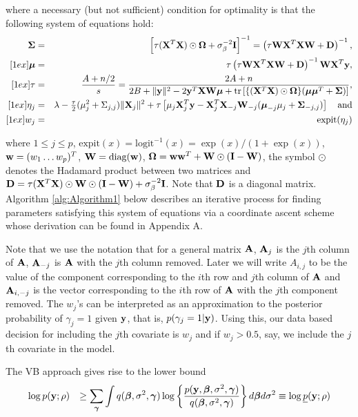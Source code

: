 \documentclass[11pt]{article}
\newtheorem{Main Result}{Main Result}
\def\vectorfontone{\bf}
\def\vectorfonttwo{\boldsymbol}
\def\vu{{\vectorfontone u}}                      %
\def\vw{{\vectorfontone w}}                      %
\def\vy{{\vectorfontone y}}                      %
\def\vbeta{{\vectorfonttwo \beta}}               %
\def\vgamma{{\vectorfonttwo \gamma}}             %
\def\vmu{{\vectorfonttwo \mu}}                   %
\def\matrixfontone{\bf}
\def\matrixfonttwo{\boldsymbol}
\def\mA{{\matrixfontone A}}                      %
\def\mD{{\matrixfontone D}}                      %
\def\mI{{\matrixfontone I}}                      %
\def\mW{{\matrixfontone W}}                      %
\def\mX{{\matrixfontone X}}                      %
\def\mSigma{{\matrixfonttwo \Sigma}}             %
\def\mOmega{{\matrixfonttwo \Omega}}             %
\def\ds{\displaystyle}
\def\tr{\text{tr}}
\DeclareMathOperator{\expit}{expit}
\newcommand{\joc}[1]{{\color{black}#1}}
\begin{document}
\noindent where a necessary (but  not sufficient) condition
for optimality is that the following system of equations hold:
\begin{eqnarray}
\mSigma &=&
\left[\tau (\mX^{T}\mX)\odot\mOmega + \sigma_\beta^{-2}\mI \right]^{-1}= \left( \tau\mW\mX^T\mX\mW + \mD \right)^{-1},\label{eq:mSigma}\\ [1ex]
\vmu
&=& \tau\left( \tau\mW\mX^T\mX\mW + \mD \right)^{-1}\mW\mX^{T}\vy,\label{eq:vmu}\\ [1ex]
\tau
&=& \frac{A+n/2}{s}= \frac{2A+n}{2B +
	\|\vy\|^2 - 2\vy^{T}\mX\mW\vmu
	+\tr\left[ \{(\mX^{T}\mX)\odot\mOmega\}(\vmu\vmu^{T} + \mSigma) \right]},\label{eq:tau}\\ [1ex]
\eta_j
&=&  \lambda
- \tfrac{\tau}{2} (\mu_j^2 + \Sigma_{j,j})\| \mX_j \|^2 + \tau\left[
\mu_j\mX_j^{T}\vy - \mX_j^{T}\mX_{-j}\mW_{-j}(\vmu_{-j}\mu_j + \mSigma_{-j,j})\right] \quad \mbox{and} \label{eq:etaj}\\ [1ex]
w_j
&=& \expit(\eta_j) \label{eq:wj}
\end{eqnarray}

\noindent where $1\le j\le p$, \joc{$\mbox{expit}(x) = \mbox{logit}^{-1}(x) = \exp(x)/(1+\exp(x))$,} 
$\vw=(w_1 \ldots w_p)^{T}$, $\mW=\mbox{diag}(\vw)$,
$\mOmega = \vw\vw^{T} + \mW\odot(\mI - \mW)$,
the symbol $\odot$ denotes the Hadamard product between two matrices
and
$\mD=\tau(\mX^T\mX)\odot\mW\odot(\mI-\mW)+\sigma_\beta^{-2}\mI$. Note that $\mD$ is
a diagonal matrix. Algorithm \ref{alg:Algorithm1} below describes an iterative process for finding
parameters satisfying this system of equations via a coordinate ascent scheme
\joc{whose derivation can be found in Appendix A.}




Note that we use the
notation that for a general matrix $\mA$, $\mA_j$ is the $j$th column of
$\mA$, $\mA_{-j}$ is $\mA$ with the $j$th column removed. Later we will
write $A_{i,j}$ to be the value \joc{of} the component corresponding to the $i$th row and
$j$th column of $\mA$ and $\mA_{i,-j}$ is the vector corresponding to the $i$th row of
$\mA$ with the $j$th component removed. The $w_j$'s can be interpreted as an
approximation to the posterior probability of $\gamma_j=1$ given $\vy$, that is,
$p(\gamma_j=1|\vy)$. \joc{Using this, our data based decision for} including the $j$th 
covariate is $w_j$ and if $w_j>0.5$, say, we include the $j$th covariate in the 
model.


The VB approach gives rise to the lower bound
$$
\begin{array}{rl}
\log p(\vy;\rho)
    & \ds \ge \sum_{\vgamma} \int q(\vbeta,\sigma^2,\vgamma) \log\left\{ \frac{p(\vy,\vbeta,\sigma^2,\vgamma)}{q(\vbeta,\sigma^2,\vgamma)} \right\} d\vbeta d\sigma^2
    \equiv \log \underline{p}(\vy;\rho)
\end{array}
$$
\end{document}
